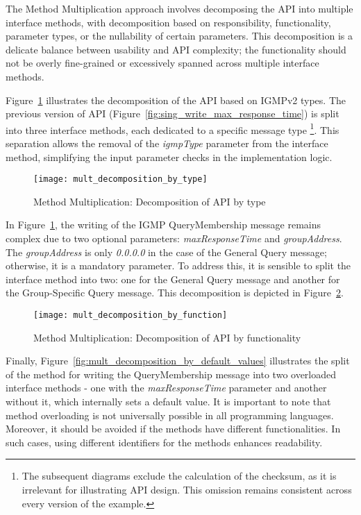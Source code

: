 The Method Multiplication approach involves decomposing the API into multiple interface methods,
with decomposition based on responsibility, functionality, parameter types, or the nullability of certain parameters.
This decomposition is a delicate balance between usability and API complexity; the functionality should not be overly
fine-grained or excessively spanned across multiple interface methods.

Figure~\ref{fig:mult_decomposition_by_type} illustrates the decomposition of the API based on IGMPv2 types.
The previous version of API (Figure~\ref{fig:sing_write_max_response_time}) is split into three interface methods,
each dedicated to a specific message type
\footnote{
    The subsequent diagrams exclude the calculation of the checksum, as it is irrelevant for illustrating API design.
    This omission remains consistent across every version of the example.
}.
This separation allows the removal of the \textit{igmpType} parameter from the interface method,
simplifying the input parameter checks in the implementation logic.

\begin{figure}[!htb]
    \centering
    \texttt{[image: mult\_decomposition\_by\_type]}
    \caption{Method Multiplication: Decomposition of API by type}
    \label{fig:mult_decomposition_by_type}
\end{figure}

In Figure~\ref{fig:mult_decomposition_by_type}, the writing of the IGMP QueryMembership message remains complex due
to two optional parameters: \textit{maxResponseTime} and \textit{groupAddress}.
The \textit{groupAddress} is only \textit{0.0.0.0} in the case of the General Query message; otherwise,
it is a mandatory parameter.
To address this, it is sensible to split the interface method into two: one for the General Query message and another
for the Group-Specific Query message.
This decomposition is depicted in Figure~\ref{fig:mult_decomposition_by_function}.

\begin{figure}[!htb]
    \centering
    \texttt{[image: mult\_decomposition\_by\_function]}
    \caption{Method Multiplication: Decomposition of API by functionality}
    \label{fig:mult_decomposition_by_function}
\end{figure}

Finally, Figure~\ref{fig:mult_decomposition_by_default_values} illustrates the split of the method for writing
the QueryMembership message into two overloaded interface methods - one with the \textit{maxResponseTime} parameter
and another without it, which internally sets a default value.
It is important to note that method overloading is not universally possible in all programming languages.
Moreover, it should be avoided if the methods have different functionalities.
In such cases, using different identifiers for the methods enhances readability.

